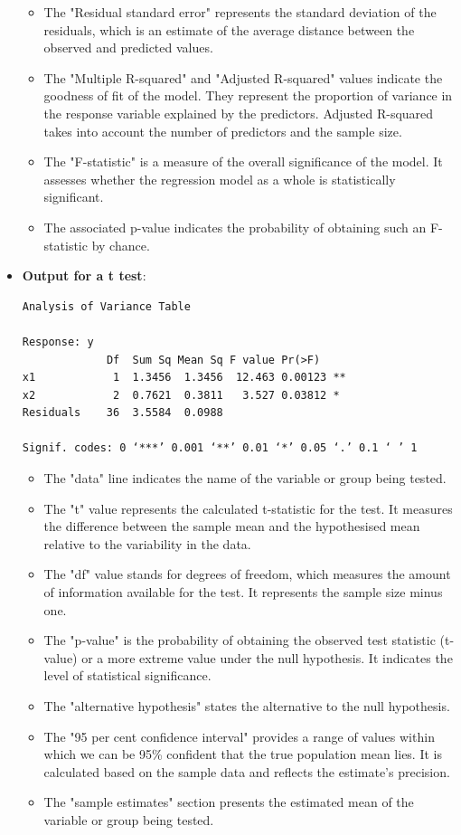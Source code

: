 \documentclass[12pt]{book}
\begin{document}
\begin{itemize}
\begin{itemize}
\item The "Residual standard error" represents the standard deviation of the residuals, which is an estimate of the average distance between the observed and predicted values.
\item The "Multiple R-squared" and "Adjusted R-squared" values indicate the goodness of fit of the model. They represent the proportion of variance in the response variable explained by the predictors. Adjusted R-squared takes into account the number of predictors and the sample size.
\item The "F-statistic" is a measure of the overall significance of the model. It assesses whether the regression model as a whole is statistically significant. 
\item The associated p-value indicates the probability of obtaining such an F-statistic by chance.
\end{itemize}

\item \textbf{Output for a t test}:

\begin{mdframed}[backgroundcolor=gray!15, linecolor=black]
\begin{verbatim}
Analysis of Variance Table

Response: y
             Df  Sum Sq Mean Sq F value Pr(>F)    
x1            1  1.3456  1.3456  12.463 0.00123 **
x2            2  0.7621  0.3811   3.527 0.03812 * 
Residuals    36  3.5584  0.0988                   

Signif. codes: 0 ‘***’ 0.001 ‘**’ 0.01 ‘*’ 0.05 ‘.’ 0.1 ‘ ’ 1
\end{verbatim}
\end{mdframed}

\begin{itemize}
\item The "data" line indicates the name of the variable or group being tested.
\item The "t" value represents the calculated t-statistic for the test. It measures the difference between the sample mean and the hypothesised mean relative to the variability in the data.
\item The "df" value stands for degrees of freedom, which measures the amount of information available for the test. It represents the sample size minus one.
\item The "p-value" is the probability of obtaining the observed test statistic (t-value) or a more extreme value under the null hypothesis. It indicates the level of statistical significance.
\item The "alternative hypothesis" states the alternative to the null hypothesis.
\item The "95 per cent confidence interval" provides a range of values within which we can be 95\% confident that the true population mean lies. It is calculated based on the sample data and reflects the estimate's precision.
\item The "sample estimates" section presents the estimated mean of the variable or group being tested.
\end{itemize}


\end{itemize}
\end{document}
